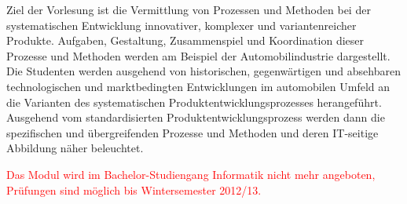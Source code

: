\begin{module}
\begin{content}
Ziel der Vorlesung ist die Vermittlung von Prozessen und Methoden bei der systematischen Entwicklung innovativer, komplexer und variantenreicher Produkte. Aufgaben, Gestaltung, Zusammenspiel und Koordination dieser Prozesse und Methoden werden am Beispiel der Automobilindustrie dargestellt.\newline
Die Studenten werden ausgehend von historischen, gegenwärtigen und absehbaren technologischen und marktbedingten Entwicklungen im automobilen Umfeld an die Varianten des systematischen Produktentwicklungsprozesses herangeführt. Ausgehend vom standardisierten Produktentwicklungsprozess werden dann die spezifischen und übergreifenden Prozesse und Methoden und deren IT-seitige Abbildung näher beleuchtet.


\end{content}

\begin{remarks}\textcolor{red}{Das Modul wird im Bachelor-Studiengang Informatik nicht mehr angeboten, Prüfungen sind möglich bis Wintersemester 2012/13.}

\end{remarks}

\end{module}

